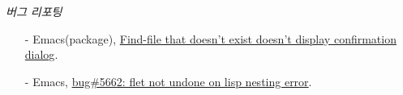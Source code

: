 \documentclass[line,margin]{res}
\begin{document}
\begin{resume}
  {\sl 버그 리포팅}
  \vspace{-4mm}
  {
    \small
    \begin{itemize}
    \item[-] Emacs(package),
      \href{https://github.com/gempesaw/ido-vertical-mode.el/issues/14#issuecomment-74077234}
      {Find-file that doesn't exist doesn't display confirmation dialog}.
    \item[-] Emacs,
      \href{https://lists.gnu.org/archive/html/bug-gnu-emacs/2014-11/msg00518.html}
      {bug\#5662: flet not undone on lisp nesting error}.
    \end{itemize}
  }

\end{resume}

\end{document}
